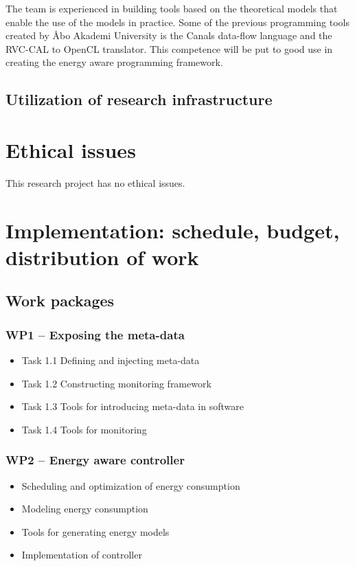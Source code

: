 \documentclass{article}
\begin{document}
The team is experienced in building tools based on the theoretical models that enable the use of the models in practice. 
Some of the previous programming tools created by \AA{}bo Akademi University is the Canals data-flow language and the RVC-CAL to OpenCL translator. 
This competence will be put to good use in creating the energy aware programming framework.

\subsection{Utilization of research infrastructure}

\section{Ethical issues}
This research project has no ethical issues.

\section{Implementation: schedule, budget, distribution of work}

\subsection{Work packages}
\subsubsection{WP1 -- Exposing the meta-data}
\begin{itemize}
 \item Task 1.1 Defining and injecting meta-data
 \item Task 1.2 Constructing monitoring framework
 \item Task 1.3 Tools for introducing meta-data in software
 \item Task 1.4 Tools for monitoring
\end{itemize}

\subsubsection{WP2 -- Energy aware controller}
\begin{itemize}
 \item Scheduling and optimization of energy consumption
 \item Modeling energy consumption
 \item Tools for generating energy models
 \item Implementation of controller
\end{itemize}
\end{document}
